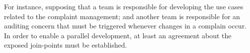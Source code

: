 For instance, supposing that a team is responsible for developing the use cases related to the complaint management; and another team is responsible for an auditing concern that must be triggered whenever changes in a complain occur. In order to enable a parallel development, at least an agreement about the exposed join-points must be established.     


